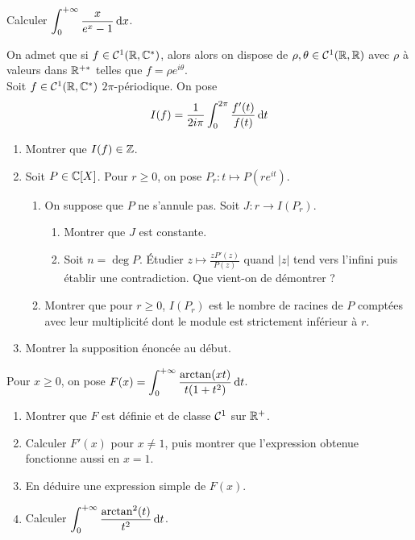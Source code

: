 \documentclass[12pt,a4paper]{exo_book}
\begin{document}
\begin{exo}
    Calculer $\displaystyle \int_0^{+\infty} \frac{x}{e^x - 1} {\rm \, d} x$.
\end{exo}

\begin{exo}
    On admet que si $f \in \mathcal{C}^1 (\mathbb{R}, \mathbb{C}^*)$, alors alors on dispose de $\rho,\theta \in \mathcal{C}^1 (\mathbb{R},\mathbb{R})$ avec $\rho$ à valeurs dans $\mathbb{R}^{+*}$ telles que $f = \rho e^{i \theta}$. \\
    Soit $f \in \mathcal{C}^1(\mathbb{R}, \mathbb{C}^*)$ $2\pi$-périodique. On pose
    \[I(f) = \frac{1}{2i\pi} \int_0^{2\pi} \frac{f'(t)}{f(t)} {\rm \, d} t\]
    \begin{enumerate}
        \item Montrer que $I(f) \in \mathbb{Z}$.
        \item Soit $P \in \mathbb{C}[X]$. Pour $r\ge0$, on pose $P_r : t \mapsto P(re^{it})$.
        \begin{enumerate}
            \item On suppose que $P$ ne s'annule pas. Soit $J : r \to I(P_r)$.
            \begin{enumerate}
                \item Montrer que $J$ est constante.
                \item Soit $n = \deg P$. Étudier $z\mapsto \frac{zP'(z)}{P(z)}$ quand $|z|$ tend vers l'infini puis établir une contradiction. Que vient-on de démontrer ?
            \end{enumerate}
            \item Montrer que pour $r\ge0$, $I(P_r)$ est le nombre de racines de $P$ comptées avec leur multiplicité dont le module est strictement inférieur à $r$.
        \end{enumerate}
        \item Montrer la supposition énoncée au début.
    \end{enumerate}
\end{exo}

\begin{exo}
    Pour $x \ge 0$, on pose $ \displaystyle F(x) = \int_0^{+\infty} \frac{\arctan(xt)}{t(1+t^2)} {\rm \, d} t$.

    \begin{enumerate}
        \item Montrer que $F$ est définie et de classe $\mathcal{C}^1$ sur $\mathbb{R}^+$.
        \item Calculer $F'(x)$ pour $x \ne 1$, puis montrer que l'expression obtenue fonctionne aussi en $x = 1$.
        \item En déduire une expression simple de $F(x)$.
        \item Calculer $\displaystyle \int_0^{+\infty} \frac{\arctan^2(t)}{t^2} {\rm \, d} t$.
    \end{enumerate}
\end{exo}
\end{document}
